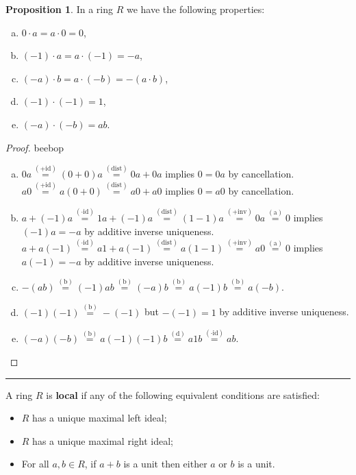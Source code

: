 \documentclass[12pt]{article}
\newcommand{\keyword}[1]{\textbf{#1}}
\newcommand{\sepline}{\rule{\textwidth}{0.4pt}}
\theoremstyle{definition}
\newtheorem{proposition}{Proposition}
\newcommand{\<}{\left\langle}
\renewcommand{\>}{\right\rangle}
\newcommand{\eqby}[1]{\overset{\mathrm{(#1)}}{=}}
\renewcommand{\_}[1]{{_{#1}}}
\begin{document}
\begin{proposition}
    In a ring $R$ we have the following properties:
    \begin{enumerate}[(a)]
        \item $0 \cdot a = a \cdot 0 = 0$,
        \item $(-1) \cdot a = a \cdot (-1) = -a$,
        \item $(-a) \cdot b = a \cdot (-b) = -(a \cdot b)$,
        \item $(-1) \cdot (-1) = 1$,
        \item $(-a) \cdot (-b) = ab$.
    \end{enumerate}
\end{proposition}
\begin{proof}
    beebop
    \begin{enumerate}[(a)]
        \item $0a \eqby{+ id} (0 + 0)a \eqby{dist} 0a + 0a$ implies $0 = 0a$ by cancellation. \\
        $a0 \eqby{+ id} a(0 + 0) \eqby{dist} a0 + a0$ implies $0 = a0$ by cancellation.
        \item $a + (-1)a \eqby{\cdot id} 1a + (-1)a \eqby{dist} (1 - 1)a \eqby{+inv} 0a \eqby{a} 0$ implies $(-1)a = -a$ by additive inverse uniqueness. \\
        $a + a(-1) \eqby{\cdot id} a1 + a(-1) \eqby{dist} a(1 - 1) \eqby{+inv} a0 \eqby{a} 0$ implies $a(-1) = -a$ by additive inverse uniqueness.
        \item $-(ab) \eqby{b} (-1)ab \eqby{b} (-a)b \eqby{b} a(-1)b \eqby{b} a(-b)$.
        \item $(-1)(-1) \eqby{b} -(-1)$ but $-(-1) = 1$ by additive inverse uniqueness.
        \item $(-a)(-b) \eqby{b} a(-1)(-1)b \eqby{d} a1b \eqby{\cdot id} ab$.
    \end{enumerate}
\end{proof}

\sepline

A ring $R$ is \keyword{local} if any of the following equivalent conditions are satisfied:
\begin{itemize}[nosep]
    \item $R$ has a unique maximal left ideal;
    \item $R$ has a unique maximal right ideal;
    \item For all $a, b \in R$, if $a + b$ is a unit then either $a$ or $b$ is a unit.
\end{itemize}
\end{document}
